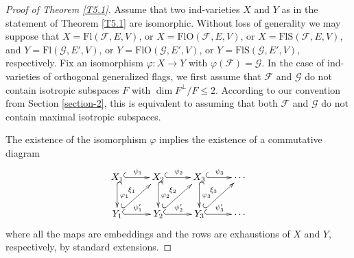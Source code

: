 \documentclass[12pt]{amsart}
\newcommand{\Flags}{\mathrm{Fl}}
\newcommand{\OFlags}{\mathrm{FlO}}
\newcommand{\SFlags}{\mathrm{FlS}}
\theoremstyle{definition}
\begin{document}
\begin{proof}[Proof of Theorem \ref{T5.1}]
Assume that two ind-varieties $X$ and $Y$ as in the statement of Theorem \ref{T5.1} are isomorphic. Without loss of generality we may suppose
that $X=\Flags(\mathcal{F},E,V)$, or  $X=\OFlags(\mathcal{F},E,V)$, or $X=\SFlags(\mathcal{F},E,V)$,
and $Y=\Flags(\mathcal{G},E',V)$, or $Y=\OFlags(\mathcal{G},E',V)$, or $Y=\SFlags(\mathcal{G},E',V)$, respectively.
Fix an isomorphism $\varphi:X\to Y$ with $\varphi(\mathcal{F})=\mathcal{G}$. In the case of ind-varieties of orthogonal generalized flags, we first assume that $\mathcal{F}$ and $\mathcal{G}$ do not contain isotropic subspaces $F$ with $\dim F^\perp/F\leq 2$. According to our convention from Section \ref{section-2}, this is equivalent to assuming that both $\mathcal{F}$ and $\mathcal{G}$ do not contain maximal isotropic subspaces.

The existence of the isomorphism $\varphi$ implies the existence of a commutative diagram
\begin{equation}
\label{diagram1}
\xymatrix{X_1 \ar@{^{(}->}[r]^{\psi_1} \ar@{^{(}->}[d]^{\varphi_1} & X_2 \ar@{^{(}->}[r]^{\psi_2} \ar@{^{(}->}[d]^{\varphi_2} & X_3 \ar@{^{(}->}[r]^{\psi_3} \ar@{^{(}->}[d]^{\varphi_3} & \cdots \\
Y_1  \ar@{^{(}->}[r]^{\psi'_1} \ar@{^{(}->}[ru]^{\xi_1} & Y_2 \ar@{^{(}->}[r]^{\psi'_2} \ar@{^{(}->}[ru]^{\xi_2} & Y_3 \ar@{^{(}->}[r]^{\psi'_3} \ar@{^{(}->}[ru]^{\xi_3} & \cdots }
\end{equation}
where all the maps are embeddings and the rows are exhaustions of $X$ and $Y$, respectively, by standard extensions.


\end{proof}
\end{document}
